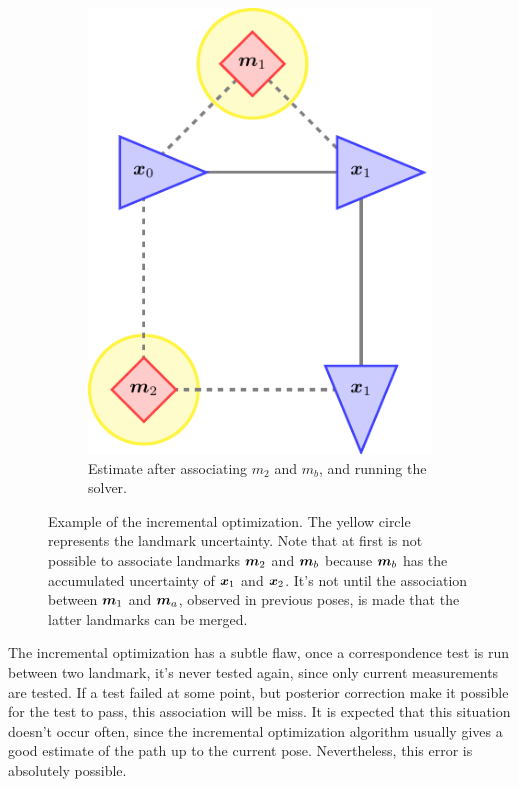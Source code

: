 \begin{figure}[htbp!]
\begin{subfigure}[htbp!]{0.25\textwidth}
        \includegraphics[width=\textwidth]{tikz/incremental3.pdf}
        \caption{Estimate after associating $m_2$ and $m_b$, and running the solver.}
    \end{subfigure}
    \caption{Example of the incremental optimization. The yellow circle represents the landmark uncertainty. Note that at first is not possible to associate landmarks $\boldsymbol{m}_2$ and $\boldsymbol{m}_b$ because $\boldsymbol{m}_b$ has the accumulated uncertainty of $\boldsymbol{x}_1$ and $\boldsymbol{x}_2$. It's not until the association between $\boldsymbol{m}_1$ and $\boldsymbol{m}_a$, observed in previous poses, is made that the latter landmarks can be merged.}
    \label{fig:incremental}
\end{figure}    
The incremental optimization has a subtle flaw, once a correspondence test is run between two landmark, it's never tested again, since only current measurements are tested. If a test failed at some point, but posterior correction make it possible for the test to pass, this association will be miss. It is expected that this situation doesn't occur often, since the incremental optimization algorithm usually gives a good estimate of the path up to the current pose. Nevertheless, this error is absolutely possible.

